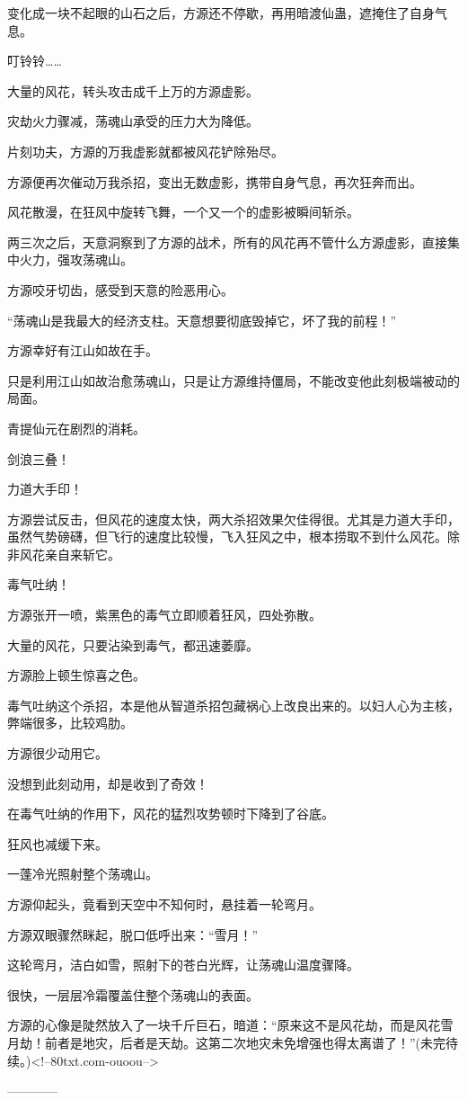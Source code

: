 \begin{this_body}
变化成一块不起眼的山石之后，方源还不停歇，再用暗渡仙蛊，遮掩住了自身气息。

叮铃铃……

大量的风花，转头攻击成千上万的方源虚影。

灾劫火力骤减，荡魂山承受的压力大为降低。

片刻功夫，方源的万我虚影就都被风花铲除殆尽。

方源便再次催动万我杀招，变出无数虚影，携带自身气息，再次狂奔而出。

风花散漫，在狂风中旋转飞舞，一个又一个的虚影被瞬间斩杀。

两三次之后，天意洞察到了方源的战术，所有的风花再不管什么方源虚影，直接集中火力，强攻荡魂山。

方源咬牙切齿，感受到天意的险恶用心。

“荡魂山是我最大的经济支柱。天意想要彻底毁掉它，坏了我的前程！”

方源幸好有江山如故在手。

只是利用江山如故治愈荡魂山，只是让方源维持僵局，不能改变他此刻极端被动的局面。

青提仙元在剧烈的消耗。

剑浪三叠！

力道大手印！

方源尝试反击，但风花的速度太快，两大杀招效果欠佳得很。尤其是力道大手印，虽然气势磅礴，但飞行的速度比较慢，飞入狂风之中，根本捞取不到什么风花。除非风花亲自来斩它。

毒气吐纳！

方源张开一喷，紫黑色的毒气立即顺着狂风，四处弥散。

大量的风花，只要沾染到毒气，都迅速萎靡。

方源脸上顿生惊喜之色。

毒气吐纳这个杀招，本是他从智道杀招包藏祸心上改良出来的。以妇人心为主核，弊端很多，比较鸡肋。

方源很少动用它。

没想到此刻动用，却是收到了奇效！

在毒气吐纳的作用下，风花的猛烈攻势顿时下降到了谷底。

狂风也减缓下来。

一蓬冷光照射整个荡魂山。

方源仰起头，竟看到天空中不知何时，悬挂着一轮弯月。

方源双眼骤然眯起，脱口低呼出来：“雪月！”

这轮弯月，洁白如雪，照射下的苍白光辉，让荡魂山温度骤降。

很快，一层层冷霜覆盖住整个荡魂山的表面。

方源的心像是陡然放入了一块千斤巨石，暗道：“原来这不是风花劫，而是风花雪月劫！前者是地灾，后者是天劫。这第二次地灾未免增强也得太离谱了！”(未完待续。)<!--80txt.com-ouoou-->

------------

\end{this_body}

